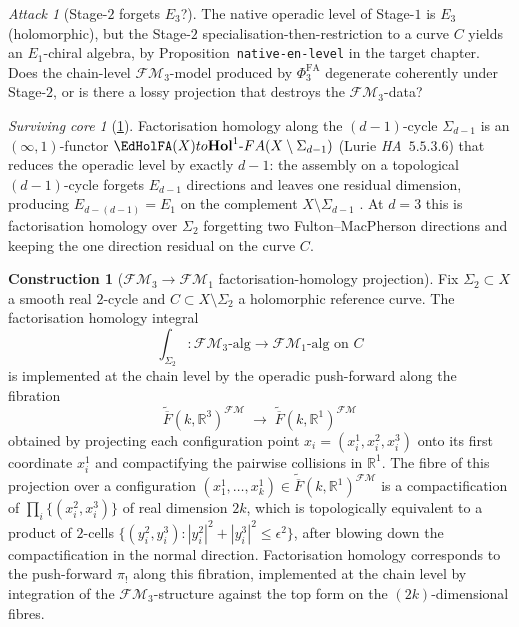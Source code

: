 \documentclass[11pt]{article}
\theoremstyle{definition}
\newtheorem{construction}[theorem]{Construction}
\theoremstyle{remark}
\newtheorem{attack}[theorem]{Attack}
\newtheorem{survivor}[theorem]{Surviving core}
\newcommand{\FMbar}{\overline{F}}
\newcommand{\FM}{\mathcal{FM}}
\newcommand{\Eone}{E_1}
\newcommand{\PhiFA}{\Phi^{\mathrm{FA}}}
\begin{document}
\begin{attack}[Stage-$2$ forgets $E_3$?]
\label{att:cycle-8}
The native operadic level of Stage-$1$ is $E_3$ (holomorphic), but the
Stage-$2$ specialisation-then-restriction to a curve $C$ yields an
$\Eone$-chiral algebra, by Proposition~\texttt{native-en-level} in the
target chapter. Does the chain-level $\FM_3$-model produced by
$\PhiFA_3$ degenerate coherently under Stage-$2$, or is there a lossy
projection that destroys the $\FM_3$-data?
\end{attack}

\begin{survivor}[\ref{att:cycle-8}]
Factorisation homology along the $(d-1)$-cycle $\Sigma_{d-1}$ is
an $(\infty, 1)$-functor
$\EdHolFA(X) \to \mathbf{Hol}^1\text{-}\mathrm{FA}(X \setminus \Sigma_{d-1})$
(Lurie \emph{HA}~$5.5.3.6$) that reduces the operadic level by exactly
$d - 1$: the assembly on a topological $(d-1)$-cycle forgets $E_{d-1}$
directions and leaves one residual dimension, producing
$E_{d - (d-1)} = \Eone$ on the complement $X \setminus \Sigma_{d-1}$
\cite[Francis--Gaitsgory 2012, Lemma 3.3.4]{FrancisGaitsgory2012}.
At $d = 3$ this is factorisation homology over $\Sigma_2$ forgetting
two Fulton--MacPherson directions and keeping the one direction
residual on the curve $C$.
\end{survivor}

\begin{construction}[$\FM_3 \to \FM_1$ factorisation-homology projection]
\label{constr:fm3-to-fm1}
Fix $\Sigma_2 \subset X$ a smooth real $2$-cycle and $C \subset
X \setminus \Sigma_2$ a holomorphic reference curve. The factorisation
homology integral
\[
 \int_{\Sigma_2} \colon \FM_3\text{-alg} \longrightarrow \FM_1\text{-alg on } C
\]
is implemented at the chain level by the operadic push-forward along
the fibration
\[
 \widetilde{\FMbar}(k, \mathbb{R}^3)^{\FM}
  \;\longrightarrow\;
  \widetilde{\FMbar}(k, \mathbb{R}^1)^{\FM}
\]
obtained by projecting each configuration point $x_i = (x_i^1, x_i^2, x_i^3)$
onto its first coordinate $x_i^1$ and compactifying the pairwise
collisions in $\mathbb{R}^1$. The fibre of this projection over a
configuration $(x_1^1, \ldots, x_k^1) \in \widetilde{\FMbar}(k,
\mathbb{R}^1)^{\FM}$ is a compactification of
$\prod_i \{(x_i^2, x_i^3)\}$ of real dimension $2k$, which is
topologically equivalent to a product of $2$-cells $\{(y_i^2, y_i^3) :
|y_i^2|^2 + |y_i^3|^2 \leq \epsilon^2\}$, after blowing down the
compactification in the normal direction. Factorisation homology
corresponds to the push-forward $\pi_!$ along this fibration,
implemented at the chain level by integration of the $\FM_3$-structure
against the top form on the $(2k)$-dimensional fibres.
\end{construction}
\end{document}

